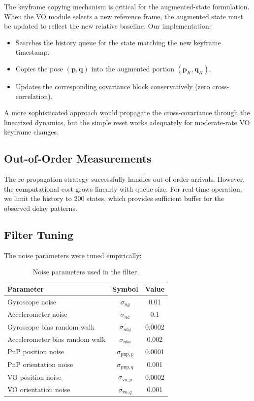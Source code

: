 \documentclass[11pt,a4paper]{article}
\begin{document}
The keyframe copying mechanism is critical for the augmented-state formulation. When the VO module selects a new reference frame, the augmented state must be updated to reflect the new relative baseline. Our implementation:

\begin{itemize}
  \item Searches the history queue for the state matching the new keyframe timestamp.
  \item Copies the pose \((\mathbf{p}, \mathbf{q})\) into the augmented portion \((\mathbf{p}_K, \mathbf{q}_K)\).
  \item Updates the corresponding covariance block conservatively (zero cross-correlation).
\end{itemize}

A more sophisticated approach would propagate the cross-covariance through the linearized dynamics, but the simple reset works adequately for moderate-rate VO keyframe changes.

\subsection{Out-of-Order Measurements}
\label{sec:disc_ooo}

The re-propagation strategy successfully handles out-of-order arrivals. However, the computational cost grows linearly with queue size. For real-time operation, we limit the history to 200 states, which provides sufficient buffer for the observed delay patterns.

\subsection{Filter Tuning}
\label{sec:tuning}

The noise parameters were tuned empirically:

\begin{table}[H]
  \centering
  \caption{Noise parameters used in the filter.}
  \label{tab:noise}
  \begin{tabular}{lcc}
    \toprule
    Parameter & Symbol & Value \\
    \midrule
    Gyroscope noise & \(\sigma_{ng}\) & 0.01 \\
    Accelerometer noise & \(\sigma_{na}\) & 0.1 \\
    Gyroscope bias random walk & \(\sigma_{nbg}\) & 0.0002 \\
    Accelerometer bias random walk & \(\sigma_{nba}\) & 0.002 \\
    PnP position noise & \(\sigma_{\text{pnp},p}\) & 0.0001 \\
    PnP orientation noise & \(\sigma_{\text{pnp},q}\) & 0.001 \\
    VO position noise & \(\sigma_{\text{vo},p}\) & 0.0002 \\
    VO orientation noise & \(\sigma_{\text{vo},q}\) & 0.001 \\
    \bottomrule
  \end{tabular}
\end{table}
\end{document}
